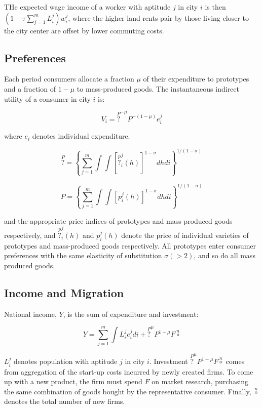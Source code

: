THe expected wage income of a worker with aptitude $j$ in city $i$ is then $(1 - \tau \sum_{j=1}^m L_i^j)w_i^j$, where the higher land rents pair by those living closer to the city center are offset by lower commuting costs.

\subsection{Preferences}

Each period consumers allocate a fraction $\mu$ of their expenditure to prototypes and a fraction of $1 - \mu$ to mass-produced goods. The instantaneous indirect utility of a consumer in city $i$ is:

\begin{equation}
  V_i = \overset{P}{?}^{-\mu} P^{-(1 - \mu)}e_i^j 
\end{equation}

where $e_i$ denotes individual expenditure.

\begin{equation}
  \overset{P}{?} = \left\{ \sum_{j=1}^m \int \int [\overset{p}{?}_i^j (h)]^{1 - \sigma} dh di \right\}^{1/(1 - \sigma)} 
\end{equation}

\begin{equation}
  P = \left\{ \sum_{j=1}^m \int \int [p_i^j (h)]^{1 - \sigma} dh di \right\}^{1/(1 - \sigma)} 
\end{equation}

and the appropriate price indices of prototypes and mass-produced goods respectively, and $\overset{p}{?}_i^j(h)$ and $p_i^j(h)$ denote the price of individual varieties of prototypes and mass-produced goods respectively. All prototypes enter consumer preferences with the same elasticity of substitution $\sigma (> 2)$, and so do all mass produced goods.

\subsection{Income and Migration}

National income, $Y$, is the sum of expenditure and investment:

\begin{equation}
  Y = \sum_{j=1}^m \int L_i^j e_i^j di + \overset{P}{?}^{\mu} P^{1 - \mu} F \overset{n}{\circ}
\end{equation}

$L_i^j$ denotes population with aptitude $j$ in city $i$. Investment $\overset{P}{?}^{\mu} P^{1 - \mu}F\overset{n}{\circ}$ comes from aggregation of the start-up costs incurred by newly created firms. To come up with a new product, the firm must spend $F$ on market research, purchasing the same combination of goods bought by the representative consumer. Finally, $\overset{n}{\circ}$ denotes the total number of new firms.

